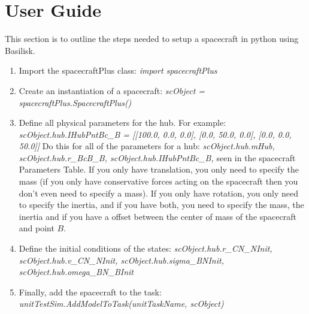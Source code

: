 \section{User Guide}

This section is to outline the steps needed to setup a spacecraft in python using Basilisk.

\begin{enumerate}
	\item Import the spacecraftPlus class: \newline \textit{import spacecraftPlus}
	\item Create an instantiation of a spacecraft: \newline \textit{scObject = spacecraftPlus.SpacecraftPlus()}
	\item Define all physical parameters for the hub. For example: \newline
	\textit{scObject.hub.IHubPntBc\_B = [[100.0, 0.0, 0.0], [0.0, 50.0, 0.0], [0.0, 0.0, 50.0]]}
	Do this for all of the parameters for a hub: \textit{scObject.hub.mHub, scObject.hub.r\_BcB\_B, scObject.hub.IHubPntBc\_B,} seen in the spacecraft Parameters Table. If you only have translation, you only need to specify the mass (if you only have conservative forces acting on the spacecraft then you don't even need to specify a mass). If you only have rotation, you only need to specify the inertia, and if you have both, you need to specify the mass, the inertia and if you have a offset between the center of mass of the spacecraft and point $B$.
	\item Define the initial conditions of the states: \textit{scObject.hub.r\_CN\_NInit,  scObject.hub.v\_CN\_NInit, scObject.hub.sigma\_BNInit, scObject.hub.omega\_BN\_BInit}
	\item Finally, add the spacecraft to the task: \textit{unitTestSim.AddModelToTask(unitTaskName, scObject)}
\end{enumerate}
